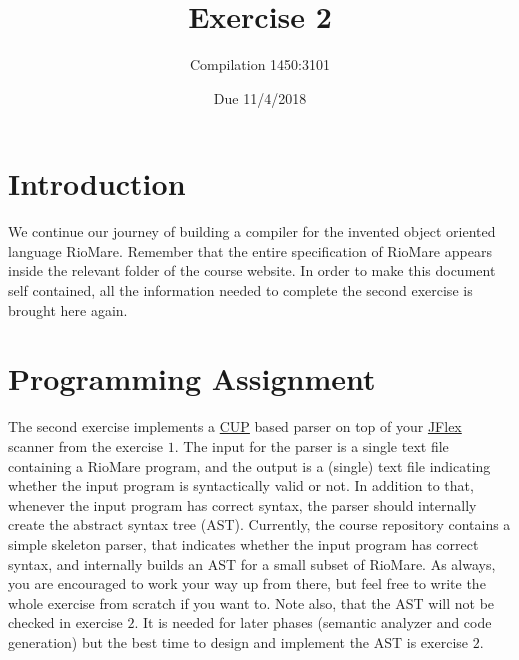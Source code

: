 \documentclass{article}
\begin{document}
\title{Exercise 2}

\author{Compilation 1450:3101}

\date{Due 11/4/2018}

\maketitle

\section{Introduction}
We continue our journey of building a compiler
for the invented object oriented language RioMare.
Remember that the entire specification of RioMare appears
inside the relevant folder of the course website.
In order to make this document self contained,
all the information needed to complete the second exercise is brought here again.
\section{Programming Assignment}
The second exercise implements a \href{http://www2.cs.tum.edu/projects/cup/}{CUP} based
parser on top of your \href{http://jflex.de/}{JFlex} scanner from the exercise $1$.
The input for the parser is a single text file containing a RioMare program,
and the output is a (single) text file indicating whether the input program
is syntactically valid or not. In addition to that,
whenever the input program has correct syntax,
the parser should internally create the abstract syntax tree (AST).
Currently, the course repository contains a simple skeleton
parser, that indicates whether the input program has correct syntax,
and internally builds an AST for a small subset of RioMare.
As always, you are encouraged to work your way up from there,
but feel free to write the whole exercise from scratch if you want to.
Note also, that the AST will not be checked in exercise $2$.
It is needed for later phases (semantic analyzer and code generation)
but the best time to design and implement the AST is exercise $2$.
\end{document}
